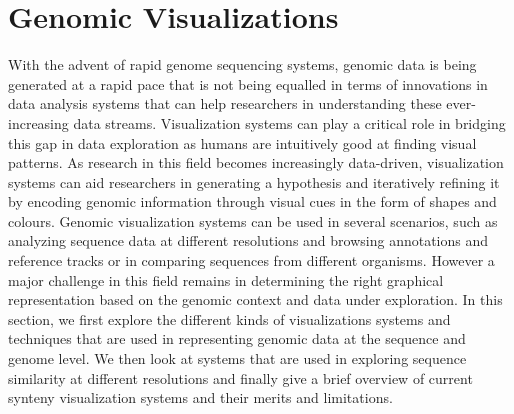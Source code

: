 \section{Genomic Visualizations} 
With the advent of rapid genome sequencing systems, genomic data is being generated at a rapid pace that is not being equalled in terms of innovations in data analysis systems that can help researchers in understanding these ever-increasing data streams. Visualization systems can play a critical role in bridging this gap in data exploration as humans are intuitively good at finding visual patterns. As research in this field becomes increasingly data-driven, visualization systems can aid researchers in generating a hypothesis and iteratively refining it by encoding genomic information through visual cues in the form of shapes and colours\cite{nusrat2019tasks}. Genomic visualization systems can be used in several scenarios, such as analyzing sequence data at different resolutions and browsing annotations and reference tracks or in comparing sequences from different organisms\cite{nielsen2010visualizing}. However a major challenge in this field remains in determining the right graphical representation based on the genomic context and data under exploration. In this section, we first explore the different kinds of visualizations systems and techniques that are used in representing genomic data at the sequence and genome level. We then look at systems that are used in exploring sequence similarity at different resolutions and finally give a brief overview of current synteny visualization systems and their merits and limitations.

